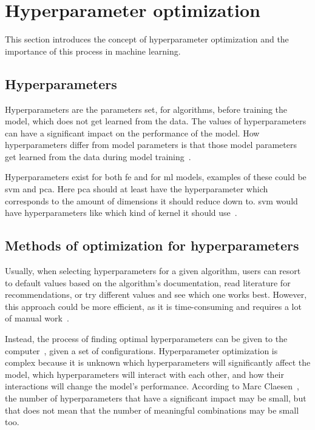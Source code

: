 \section{Hyperparameter optimization}\label{sec:hyperparam}
This section introduces the concept of hyperparameter optimization and the importance of this process in machine learning.


\subsection{Hyperparameters}\label{subsec:hyperparam-what}
Hyperparameters are the parameters set, for algorithms, before training the model, which does not get learned from the data. The values of hyperparameters can have a significant impact on the performance of the model. How hyperparameters differ from model parameters is that those model parameters get learned from the data during model training~\cite{probst2019tunability}.

Hyperparameters exist for both \gls{fe} and for \gls{ml} models, examples of these could be \gls{svm} and \gls{pca}. Here \gls{pca} should at least have the hyperparameter which corresponds to the amount of dimensions it should reduce down to. \gls{svm} would have hyperparameters like which kind of kernel it should use~\cite{probst2019tunability}.

\subsection{Methods of optimization for hyperparameters}\label{subsec:hyperparam-how}
Usually, when selecting hyperparameters for a given algorithm, users can resort to default values based on the algorithm's documentation, read literature for recommendations, or try different values and see which one works best. However, this approach could be more efficient, as it is time-consuming and requires a lot of manual work~\cite{probst2019tunability}.

Instead, the process of finding optimal hyperparameters can be given to the computer~\cite{automated-machine-learning}, given a set of configurations. Hyperparameter optimization is complex because it is unknown which hyperparameters will significantly affect the model, which hyperparameters will interact with each other, and how their interactions will change the model's performance. According to Marc Claesen~\cite{hyperparam-search}, the number of hyperparameters that have a significant impact may be small, but that does not mean that the number of meaningful combinations may be small too.

